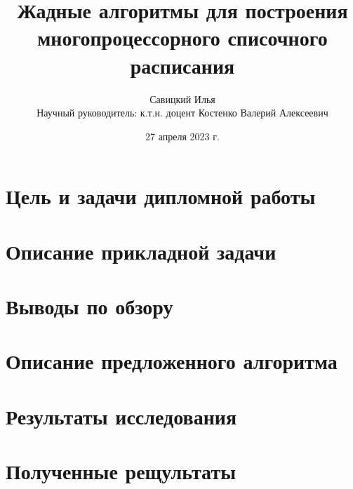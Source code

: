 \documentclass[hyperref=unicode, aspectratio=169]{beamer}
\title[]{Жадные алгоритмы для построения многопроцессорного списочного расписания}
\author[]{Савицкий Илья\\Научный руководитель: к.т.н. доцент Костенко Валерий Алексеевич}
\date{27 апреля 2023 г.}
\begin{document}
\begin{frame}
    \titlepage
\end{frame}

\section{Цель и задачи дипломной работы}


\section{Описание прикладной задачи}


\section{Выводы по обзору}


\section{Описание предложенного алгоритма}


\section{Результаты исследования}


\section{Полученные рещультаты}



\end{document}
